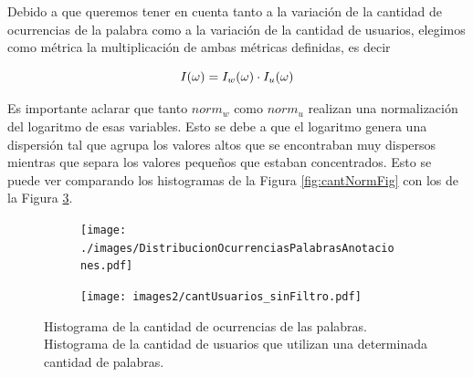 
Debido a que queremos tener en cuenta tanto a la variación de la cantidad de ocurrencias de la palabra como a la variación de la cantidad de usuarios, elegimos como métrica la multiplicación de ambas métricas definidas, es decir  

\begin{equation}
I(\omega) =  I_w(\omega) \cdot I_u(\omega)\\
\label{eq:ivalor}
\end{equation}

Es importante aclarar que tanto $norm_{w}$ como $norm_{u}$ realizan una normalización del logaritmo de esas variables. Esto se debe a que el logaritmo genera una dispersión tal que agrupa los valores altos que se encontraban muy dispersos mientras que separa los valores pequeños que estaban concentrados. Esto se puede ver comparando los histogramas de la Figura \ref{fig:cantNormFig} con los de la Figura \ref{fig:cantPalabrasSinNorm}.




\begin{figure}[!ht]\centering
  \begin{subfigure}[t]{0.49\textwidth}
    \texttt{[image: ./images/DistribucionOcurrenciasPalabrasAnotaciones.pdf]}
    \caption{}
    \label{fig:cantPalabrasAnotaciones} 
   \end{subfigure}
   \begin{subfigure}[t]{0.49\textwidth}
    \texttt{[image: images2/cantUsuarios\_sinFiltro.pdf]}
    \caption{}
    \label{fig:cantUsuarios} 
   \end{subfigure}
   \caption{ Histograma de la cantidad de ocurrencias de las palabras.  Histograma de la cantidad de usuarios que utilizan una determinada cantidad de palabras.} 
   \label{fig:cantPalabrasSinNorm} 
\end{figure}

